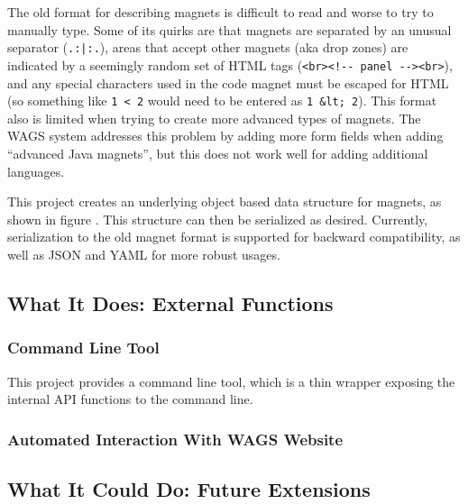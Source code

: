 \documentclass[letter,10pt]{article}
\begin{document}
The old format for describing magnets is difficult to read and worse to 
try to manually type. Some of its quirks are that magnets are separated 
by an unusual separator (\verb~.:|:.~), areas that accept other magnets 
(aka drop zones) are indicated by a seemingly random set of HTML tags 
(\verb~<br><!-- panel --><br>~), and any special characters used in the 
code magnet must be escaped for HTML (so something like \verb~1 < 2~ 
would need to be entered as \verb~1 &lt; 2~). This format also is 
limited when trying to create more advanced types of magnets. The WAGS 
system addresses this problem by adding more form fields when adding 
``advanced Java magnets'', but this does not work well for adding 
additional languages.


This project creates an underlying object based data structure for 
magnets, as shown in figure . This 
structure can then be serialized as desired. Currently, serialization to 
the old magnet format is supported for backward compatibility, as well 
as JSON and YAML for more robust usages.



\subsection{What It Does: External Functions}

\subsubsection{Command Line Tool}

This project provides a command line tool, which is a thin wrapper 
exposing the internal API functions to the command line.


\subsubsection{Automated Interaction With WAGS Website}



\subsection{What It Could Do: Future Extensions}
\end{document}
